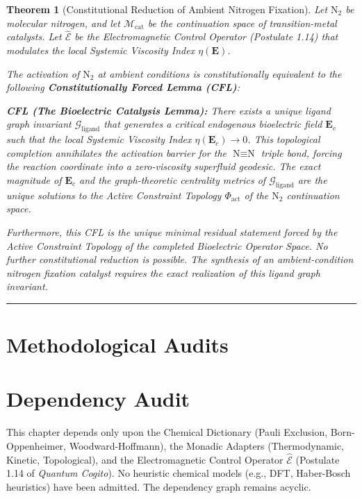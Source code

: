 \documentclass[11pt,openany]{extbook}
\newenvironment{dependencyaudit}{\section*{Dependency Audit}}{}
\theoremstyle{plain}
\newtheorem{theorem}{Theorem}[chapter]
\theoremstyle{definition}
\begin{document}
\begin{theorem}[Constitutional Reduction of Ambient Nitrogen Fixation]
Let $\text{N}_2$ be molecular nitrogen, and let $\mathcal{M}_{\text{cat}}$ be the continuation space of transition-metal catalysts. Let $\hat{\mathcal{E}}$ be the Electromagnetic Control Operator (Postulate 1.14) that modulates the local Systemic Viscosity Index $\eta(\mathbf{E})$.

The activation of $\text{N}_2$ at ambient conditions is constitutionally equivalent to the following \textbf{Constitutionally Forced Lemma (CFL)}:

\textbf{CFL (The Bioelectric Catalysis Lemma):} \textit{There exists a unique ligand graph invariant $\mathcal{G}_{\text{ligand}}$ that generates a critical endogenous bioelectric field $\mathbf{E}_c$ such that the local Systemic Viscosity Index $\eta(\mathbf{E}_c) \to 0$. This topological completion annihilates the activation barrier for the $\text{N} \equiv \text{N}$ triple bond, forcing the reaction coordinate into a zero-viscosity superfluid geodesic. The exact magnitude of $\mathbf{E}_c$ and the graph-theoretic centrality metrics of $\mathcal{G}_{\text{ligand}}$ are the unique solutions to the Active Constraint Topology $\Phi_{\text{act}}$ of the $\text{N}_2$ continuation space.}

Furthermore, this CFL is the unique minimal residual statement forced by the Active Constraint Topology of the completed Bioelectric Operator Space. No further constitutional reduction is possible. The synthesis of an ambient-condition nitrogen fixation catalyst requires the exact realization of this ligand graph invariant.
\end{theorem}

\begin{center}
\rule{0.8\textwidth}{0.4pt}
\end{center}

\section{Methodological Audits}

\begin{dependencyaudit}
\noindent This chapter depends only upon the Chemical Dictionary (Pauli Exclusion, Born-Oppenheimer, Woodward-Hoffmann), the Monadic Adapters (Thermodynamic, Kinetic, Topological), and the Electromagnetic Control Operator $\hat{\mathcal{E}}$ (Postulate 1.14 of \textit{Quantum Cogito}). No heuristic chemical models (e.g., DFT, Haber-Bosch heuristics) have been admitted. The dependency graph remains acyclic.
\end{dependencyaudit}
\end{document}
